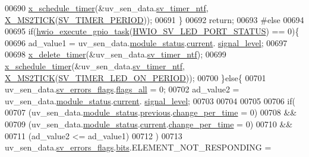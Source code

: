 \begin{DoxyCode}
00690     \hyperlink{a00036_a9e3befaa21e83f196f74201deed85346}{x\_schedule\_timer}(&uv\_sen\_data.\hyperlink{a00035_ada91b200053f2d93e3639dc4ee3415b4}{sv\_timer\_ntf},
      \hyperlink{a00036_a1732cd929c486b3a225824bb2b3dba36}{X\_MS2TICK}(\hyperlink{a00023_a8a535456285f4602701c814d7b69cc68}{SV\_TIMER\_PERIOD}));
00691     \}
00692     \textcolor{keywordflow}{return};
00693 \textcolor{preprocessor}{#else}
00694 
00695     \textcolor{keywordflow}{if}(\hyperlink{a00058_a0af9eae455fbdf4e77def5bfffa109cb}{hwio\_execute\_gpio\_task}(\hyperlink{a00058_ab1278d6ffe9c661f55b9f146f82b0be6}{HWIO\_SV\_LED\_PORT\_STATUS}) == 0)\{
00696     ad\_value1  = uv\_sen\_data.\hyperlink{a00035_a5a53c391562b059eb744ac679f3765ca}{module\_status}.\hyperlink{a00017_ab8af48cdbba92b3ae39c4470e53af944}{current}.
      \hyperlink{a00017_abcdf2bc0c2e5a14863938ae28c3bc96e}{signal\_level};
00697 
00698     \hyperlink{a00036_ab69e9af4cfa717e870d587906283635c}{x\_delete\_timer}(&uv\_sen\_data.\hyperlink{a00035_ada91b200053f2d93e3639dc4ee3415b4}{sv\_timer\_ntf});
00699     \hyperlink{a00036_a9e3befaa21e83f196f74201deed85346}{x\_schedule\_timer}(&uv\_sen\_data.\hyperlink{a00035_ada91b200053f2d93e3639dc4ee3415b4}{sv\_timer\_ntf},
      \hyperlink{a00036_a1732cd929c486b3a225824bb2b3dba36}{X\_MS2TICK}(\hyperlink{a00023_a44e4917fdf9d2a3574a3dd34537d97a7}{SV\_TIMER\_LED\_ON\_PERIOD}));
00700     \}\textcolor{keywordflow}{else}\{
00701      uv\_sen\_data.\hyperlink{a00035_aaeec6b0609dba31393f337abf1cce3d3}{sv\_errors\_flags}.\hyperlink{a00022_a1caa87b00c878186140c3bac9c8acf3b}{flags\_all} = 0;
00702     ad\_value2  = uv\_sen\_data.\hyperlink{a00035_a5a53c391562b059eb744ac679f3765ca}{module\_status}.\hyperlink{a00017_ab8af48cdbba92b3ae39c4470e53af944}{current}.
      \hyperlink{a00017_abcdf2bc0c2e5a14863938ae28c3bc96e}{signal\_level};
00703   
00704 
00705 
00706     \textcolor{keywordflow}{if}(
00707       (uv\_sen\_data.\hyperlink{a00035_a5a53c391562b059eb744ac679f3765ca}{module\_status}.\hyperlink{a00017_a0fc6d9ce6203a17f672c19d3d8747aee}{previous}.\hyperlink{a00017_ad5c4f9a39d2a36632a53205ae8eb5a5d}{change\_per\_time} = 0)
00708       &&
00709       (uv\_sen\_data.\hyperlink{a00035_a5a53c391562b059eb744ac679f3765ca}{module\_status}.\hyperlink{a00017_ab8af48cdbba92b3ae39c4470e53af944}{current}.\hyperlink{a00017_ad5c4f9a39d2a36632a53205ae8eb5a5d}{change\_per\_time} = 0)
00710       &&
00711       (ad\_value2 <= ad\_value1)
00712       )
00713         uv\_sen\_data.\hyperlink{a00035_aaeec6b0609dba31393f337abf1cce3d3}{sv\_errors\_flags}.\hyperlink{a00022_ab81eb6fb4f1351ed07b4d6c4dd6f1959}{bits}.ELEMENT\_NOT\_RESPONDING = 

\end{DoxyCode}
